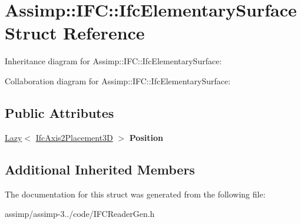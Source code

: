 \hypertarget{struct_assimp_1_1_i_f_c_1_1_ifc_elementary_surface}{\section{Assimp\+:\+:I\+F\+C\+:\+:Ifc\+Elementary\+Surface Struct Reference}
\label{struct_assimp_1_1_i_f_c_1_1_ifc_elementary_surface}
}


Inheritance diagram for Assimp\+:\+:I\+F\+C\+:\+:Ifc\+Elementary\+Surface\+:


Collaboration diagram for Assimp\+:\+:I\+F\+C\+:\+:Ifc\+Elementary\+Surface\+:
\subsection*{Public Attributes}
\begin{DoxyCompactItemize}
\item 
\hypertarget{struct_assimp_1_1_i_f_c_1_1_ifc_elementary_surface_aa78996b51b160c722edf0370e992af7b}{\hyperlink{struct_assimp_1_1_s_t_e_p_1_1_lazy}{Lazy}$<$ \hyperlink{struct_assimp_1_1_i_f_c_1_1_ifc_axis2_placement3_d}{Ifc\+Axis2\+Placement3\+D} $>$ {\bfseries Position}}\label{struct_assimp_1_1_i_f_c_1_1_ifc_elementary_surface_aa78996b51b160c722edf0370e992af7b}

\end{DoxyCompactItemize}
\subsection*{Additional Inherited Members}


The documentation for this struct was generated from the following file\+:\begin{DoxyCompactItemize}
\item 
assimp/assimp-\/3../code/I\+F\+C\+Reader\+Gen.\+h\end{DoxyCompactItemize}
